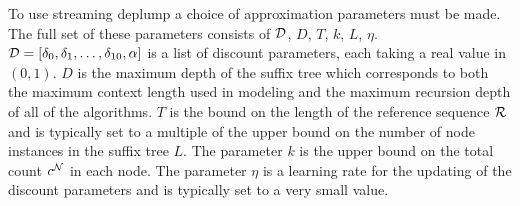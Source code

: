 To use streaming deplump a choice of approximation  parameters must be made.  The full set of these parameters consists of $\D$, $D$, $T$, $k$, $L$, $\eta$.  $\D = [\dd_0, \dd_1, \ldots, \dd_{10}, \alpha]$ is a list of discount parameters, each taking a real value in $(0,1)$.  $D$ is the maximum depth of the suffix tree which corresponds to both the maximum context length used in modeling and the maximum recursion depth of all of the algorithms.  $T$ is the bound on the length of the reference sequence $\RS$ and is typically set to a multiple of the upper bound on the number of node instances in the suffix tree $L$.  The parameter $k$ is the upper bound on the total count $c^\N$ in each node.  The parameter $\eta$ is a learning rate for the updating of the discount parameters and is typically set to a very small value.  






%
%
%				
%
